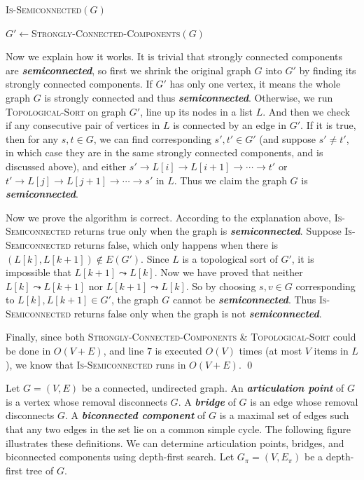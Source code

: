 \begin{algorithm}[H]
\caption{\textsc{Is-Semiconnected}$(G)$}
$G' \leftarrow $\textsc{Strongly-Connected-Components}$(G)$\\
\end{algorithm}

Now we explain how it works. It is trivial that strongly connected components are \textbf{\textsl{semiconnected}}, so first we shrink the original graph $G$ into $G'$ by finding
its strongly connected components. If $G'$ has only one vertex, it means the whole graph $G$ is strongly connected and thus \textbf{\textsl{semiconnected}}.
Otherwise, we run \textsc{Topological-Sort} on graph $G'$, line up its nodes in a list $L$. And then we check if any consecutive pair of vertices in $L$ is connected by an edge in $G'$.
If it is true, then for any $s, t\in G$, we can find corresponding $s', t'\in G'$ (and suppose $s'\neq t'$, in which case they are in the same strongly connected
components, and is discussed above), and either $s' \rightarrow L[i]\rightarrow L[i + 1] \rightarrow \cdots \rightarrow t'$
or $t' \rightarrow L[j] \rightarrow L[j + 1] \rightarrow \cdots \rightarrow s'$ in $L$. Thus we claim the graph $G$ is \textbf{\textsl{semiconnected}}.

Now we prove the algorithm is correct. According to the explanation above, \textsc{Is-Semiconnected} returns true only when the graph is \textbf{\textsl{semiconnected}}.
Suppose \textsc{Is-Semiconnected} returns false, which only happens when there is $(L[k], L[k + 1])\notin E(G')$. Since $L$ is a topological sort of $G'$, it is impossible
that $L[k + 1] \leadsto L[k]$. Now we have proved that neither $L[k] \leadsto L[k + 1]$ nor $L[k + 1] \leadsto L[k]$. So by choosing $s, v\in G$ corresponding to $L[k], L[k +1]\in G'$,
the graph $G$ cannot be \textbf{\textsl{semiconnected}}. Thus \textsc{Is-Semiconnected} returns false only when the graph is not \textbf{\textsl{semiconnected}}.

Finally, since both \textsc{Strongly-Connected-Components} \& \textsc{Topological-Sort} could be done in $O(V + E)$, and line $7$ is executed $O(V)$ times (at most $V$ items in $L$),
we know that \textsc{Is-Semiconnected} runs in $O(V + E)$.
\qed


Let $G=(V, E)$ be a connected, undirected graph. An \textbf{\textsl{articulation point}} of $G$ is a vertex whose removal disconnects $G$. A \textbf{\textsl{bridge}} of $G$ is an edge
whose removal disconnects $G$. A \textbf{\textsl{biconnected component}} of $G$ is a maximal set of edges such that any two edges in the set lie on a common simple cycle. The following figure
illustrates these definitions. We can determine articulation points, bridges, and biconnected components using depth-first search. Let $G_{\pi} = (V, E_\pi)$ be a depth-first tree of
$G$.

